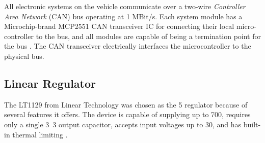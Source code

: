 All electronic systems on the vehicle communicate over a two-wire \emph{Controller Area Network} (CAN) bus operating at 1 MBit/s. Each system module has a Microchip-brand MCP2551 CAN transceiver IC for connecting their local micro-controller to the bus, and all modules are capable of being a termination point for the bus \cite{MCP2551}. The CAN transceiver electrically interfaces the microcontroller to the physical bus.

\subsection{Linear Regulator}

The LT1129 from Linear Technology was chosen as the \unit{5}{\volt} regulator because of several features it offers. The device is capable of supplying up to \unit{700}{\milli\ampere}, requires only a single \unit{3.3}{\micro\farad} output capacitor, accepts input voltages up to \unit{30}{\volt}, and has built-in thermal limiting \cite{LTC1129}.